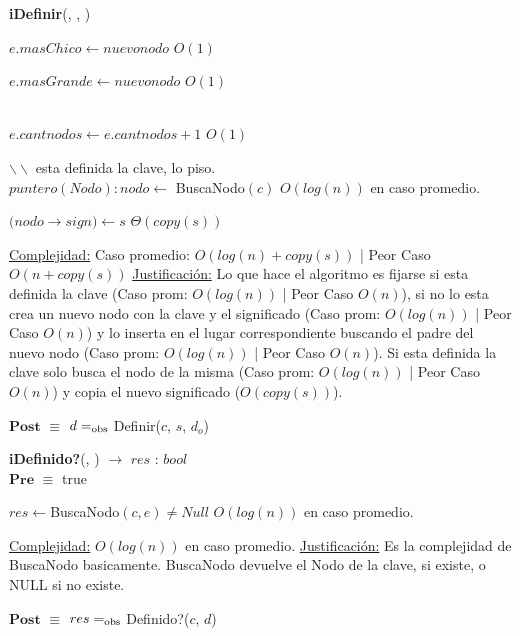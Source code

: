 \begin{algorithm}[H]{\textbf{iDefinir}(, , )}
\begin{algorithmic}[1]
					\State $e.masChico \gets nuevonodo$ \Comment $O(1)$

					\State $e.masGrande \gets nuevonodo$ \Comment $O(1)$					

				\EndIf
				\\

				\State $e.cantnodos \gets e.cantnodos + 1$ \Comment $O(1)$

			\EndIf


		\Else
			\State $\backslash\backslash$ esta definida la clave, lo piso.
			\\

			\State $puntero(Nodo): nodo \gets$ BuscaNodo$(c)$ \Comment $O(log(n))$ en caso promedio.

			\State $(nodo$$\rightarrow$$sign) \gets s$ \Comment $\Theta(copy(s))$


		\EndIf

		\medskip
		\Statex \underline{Complejidad:} Caso promedio: $O(log(n) + copy(s))$ | Peor Caso $O(n + copy(s))$
		\Statex \underline{Justificación:} Lo que hace el algoritmo es fijarse si esta definida la clave (Caso prom: $O(log(n))$ | Peor Caso $O(n)$), si no lo esta crea un nuevo nodo con la clave y el significado (Caso prom: $O(log(n))$ | Peor Caso $O(n)$) y lo inserta en el lugar correspondiente buscando el padre del nuevo nodo (Caso prom: $O(log(n))$ | Peor Caso $O(n)$). Si esta definida la clave solo busca el nodo de la misma (Caso prom: $O(log(n))$ | Peor Caso $O(n)$) y copia el nuevo significado ($O(copy(s))$).

    \end{algorithmic}
    {$\textbf{Post}$ $\equiv$ $d =_{\mathrm{obs}}$ Definir($c$, $s$, $d_o$)}
\end{algorithm}


\begin{algorithm}[H]{\textbf{iDefinido?}(, ) $\to$ $res$ : $bool$}
	{\\ $\textbf{Pre}$ $\equiv$ true}
	\begin{algorithmic}[1]

		\State $res \gets $BuscaNodo$(c,e) \neq Null$ \Comment $O(log(n))$ en caso promedio.

		\medskip
		\Statex \underline{Complejidad:} $O(log(n))$ en caso promedio.
		\Statex \underline{Justificación:} Es la complejidad de BuscaNodo basicamente. BuscaNodo devuelve el Nodo de la clave, si existe, o NULL si no existe.

    \end{algorithmic}
    {$\textbf{Post}$ $\equiv$ $res =_{\mathrm{obs}}$ Definido?($c$, $d$)}
\end{algorithm}


